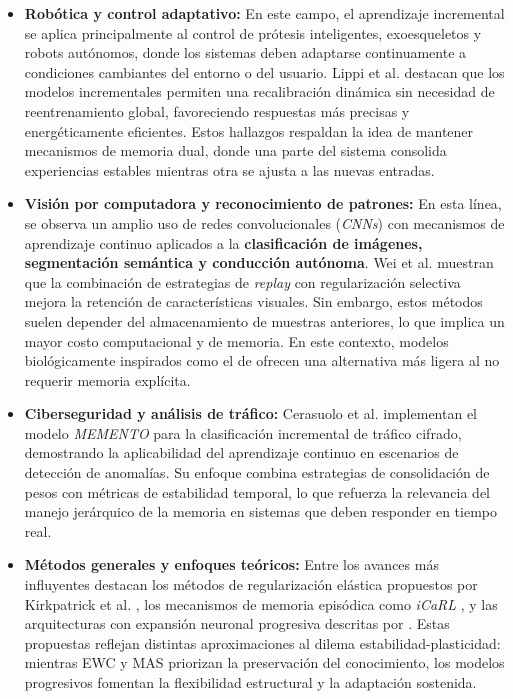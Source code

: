 \documentclass[10pt,a4paper]{article}
\begin{document}
\begin{itemize}
    \item \textbf{Robótica y control adaptativo:}  
    En este campo, el aprendizaje incremental se aplica principalmente al control de prótesis inteligentes, exoesqueletos y robots autónomos, donde los sistemas deben adaptarse continuamente a condiciones cambiantes del entorno o del usuario. 
    Lippi et al. \cite{lippi2021} destacan que los modelos incrementales permiten una recalibración dinámica sin necesidad de reentrenamiento global, favoreciendo respuestas más precisas y energéticamente eficientes.  
    Estos hallazgos respaldan la idea de mantener mecanismos de memoria dual, donde una parte del sistema consolida experiencias estables mientras otra se ajusta a las nuevas entradas.

    \item \textbf{Visión por computadora y reconocimiento de patrones:}  
    En esta línea, se observa un amplio uso de redes convolucionales (\textit{CNNs}) con mecanismos de aprendizaje continuo aplicados a la \textbf{clasificación de imágenes, segmentación semántica y conducción autónoma}.  
    Wei et al. \cite{WEI2020} muestran que la combinación de estrategias de \textit{replay} con regularización selectiva mejora la retención de características visuales.  
    Sin embargo, estos métodos suelen depender del almacenamiento de muestras anteriores, lo que implica un mayor costo computacional y de memoria. 
    En este contexto, modelos biológicamente inspirados como el de \cite{bullinaria2009} ofrecen una alternativa más ligera al no requerir memoria explícita.

    \item \textbf{Ciberseguridad y análisis de tráfico:}  
    Cerasuolo et al. \cite{CERASUOLO2024} implementan el modelo \textit{MEMENTO} para la clasificación incremental de tráfico cifrado, demostrando la aplicabilidad del aprendizaje continuo en escenarios de detección de anomalías.  
    Su enfoque combina estrategias de consolidación de pesos con métricas de estabilidad temporal, lo que refuerza la relevancia del manejo jerárquico de la memoria en sistemas que deben responder en tiempo real.

    \item \textbf{Métodos generales y enfoques teóricos:}  
    Entre los avances más influyentes destacan los métodos de regularización elástica propuestos por Kirkpatrick et al. \cite{kirkpatrick2017overcoming}, los mecanismos de memoria episódica como \textit{iCaRL} \cite{rebuffi2017icarl}, y las arquitecturas con expansión neuronal progresiva descritas por \cite{bullinaria2009}.  
    Estas propuestas reflejan distintas aproximaciones al dilema estabilidad-plasticidad: mientras EWC y MAS priorizan la preservación del conocimiento, los modelos progresivos fomentan la flexibilidad estructural y la adaptación sostenida.


\end{itemize}
\end{document}
